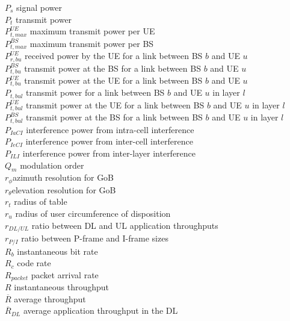 $P_s$ \mytab signal power \\
$P_t$ \mytab transmit power \\
$P_{t, max}^{UE}$ \mytab maximum transmit power per UE\\
$P_{t, max}^{BS}$ \mytab maximum transmit power per BS \\
$P_{r, bu}^{UE}$ \mytab received power by the UE for a link between BS $b$ and UE $u$ \\
$P_{t, bu}^{BS}$ \mytab transmit power at the BS for a link between BS $b$ and UE $u$ \\
$P_{t, bu}^{UE}$ \mytab transmit power at the UE for a link between BS $b$ and UE $u$ \\
$P_{t, bul}$ \mytab transmit power for a link between BS $b$ and UE $u$ in layer $l$ \\
$P_{t, bul}^{UE}$ \mytab transmit power at the UE for a link between BS $b$ and UE $u$ in layer $l$ \\
$P_{t, bul}^{BS}$ \mytab transmit power at the BS for a link between BS $b$ and UE $u$ in layer $l$ \\
$P_{IaCI}$ \mytab interference power from intra-cell interference \\
$P_{IeCI}$ \mytab interference power from inter-cell interference \\
$P_{ILI}$ \mytab interference power from inter-layer interference \\
$Q_m$ \mytab modulation order \\
$r_\phi$\mytab azimuth resolution for \acs{GoB} \\
$r_\theta$\mytab elevation resolution for \acs{GoB} \\
$r_t$ \mytab radius of table \\
$r_u$ \mytab radius of user circumference of disposition\\
$r_{DL/UL}$ \mytab ratio between \acs{DL} and \acs{UL} application throughputs\\
$r_{P/I}$ \mytab ratio between P-frame and I-frame sizes\\
$R_b$ \mytab instantaneous bit rate \\
$R_c$ \mytab code rate \\
$R_{packet}$ \mytab packet arrival rate \\
$R$ \mytab instantaneous throughput \\
$\overline{R}$ \mytab average throughput \\
$\overline{R}_{DL}$ \mytab average application throughput in the \acs{DL}\\
